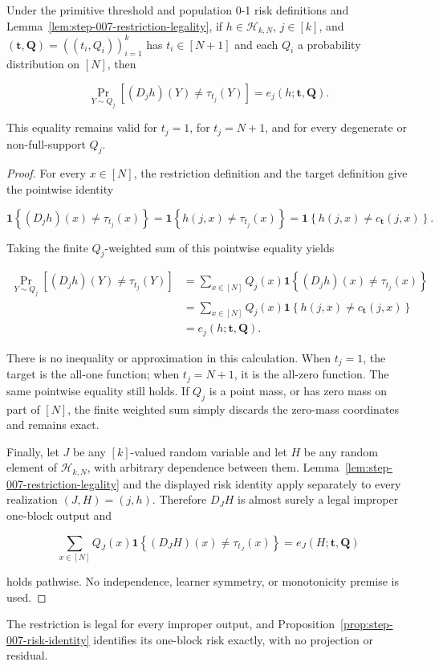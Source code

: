 \begin{proposition}\label{prop:step-007-risk-identity}
Under the primitive threshold and population 0-1 risk definitions and
Lemma~\ref{lem:step-007-restriction-legality}, if
\(h\in\mathcal H_{k,N}\), \(j\in[k]\), and
\((\boldsymbol t,\boldsymbol Q)=((t_i,Q_i))_{i=1}^k\) has
\(t_i\in[N+1]\) and each \(Q_i\) a probability distribution on \([N]\),
then

\[
  \Pr_{Y\sim Q_j}\!\left[(D_jh)(Y)\ne\tau_{t_j}(Y)\right]
  =e_j(h;\boldsymbol t,\boldsymbol Q).
\]

This equality remains valid for \(t_j=1\), for \(t_j=N+1\), and for every
degenerate or non-full-support \(Q_j\).
\end{proposition}

\begin{proof}
For every \(x\in[N]\), the restriction definition and the target definition
give the pointwise identity

\[
  \mathbf1\!\left\{(D_jh)(x)\ne\tau_{t_j}(x)\right\}
  =\mathbf1\!\left\{h(j,x)\ne\tau_{t_j}(x)\right\}
  =\mathbf1\!\left\{h(j,x)\ne c_{\boldsymbol t}(j,x)\right\}.
\]

Taking the finite \(Q_j\)-weighted sum of this pointwise equality yields

\[
\begin{aligned}
  \Pr_{Y\sim Q_j}\!\left[(D_jh)(Y)\ne\tau_{t_j}(Y)\right]
  &=\sum_{x\in[N]}Q_j(x)
       \mathbf1\!\left\{(D_jh)(x)\ne\tau_{t_j}(x)\right\}\\
  &=\sum_{x\in[N]}Q_j(x)
       \mathbf1\!\left\{h(j,x)\ne c_{\boldsymbol t}(j,x)\right\}\\
  &=e_j(h;\boldsymbol t,\boldsymbol Q).
\end{aligned}
\]

There is no inequality or approximation in this calculation. When
\(t_j=1\), the target is the all-one function; when \(t_j=N+1\), it is the
all-zero function. The same pointwise equality still holds. If \(Q_j\) is a
point mass, or has zero mass on part of \([N]\), the finite weighted sum
simply discards the zero-mass coordinates and remains exact.

Finally, let \(J\) be any \([k]\)-valued random variable and let \(H\) be any
random element of \(\mathcal H_{k,N}\), with arbitrary dependence between
them. Lemma~\ref{lem:step-007-restriction-legality} and the displayed risk
identity apply separately to every realization \((J,H)=(j,h)\). Therefore
\(D_JH\) is almost surely a legal improper one-block output and

\[
  \sum_{x\in[N]}Q_J(x)
    \mathbf1\!\left\{(D_JH)(x)\ne\tau_{t_J}(x)\right\}
  =e_J(H;\boldsymbol t,\boldsymbol Q)
\]

holds pathwise. No independence, learner symmetry, or monotonicity premise
is used. \end{proof}
The restriction is legal for every improper output, and
Proposition~\ref{prop:step-007-risk-identity} identifies its one-block risk
exactly, with no projection or residual.

